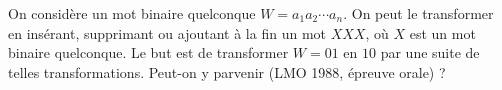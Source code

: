 On considère un mot binaire quelconque $W = a_1a_2 \cdots a_n$. On peut le transformer en insérant, supprimant ou ajoutant à la fin un mot $XXX$, où $X$ est un mot binaire quelconque. Le but est de transformer $W = 01$ en $10$ par une suite de telles transformations. Peut-on y parvenir (LMO 1988, épreuve orale) ?
